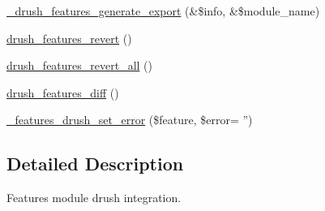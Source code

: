 \begin{DoxyCompactItemize}
\item 
\hyperlink{features_8drush_8inc_aa7000926946fab9e88e2f1798e6ec688}{\_\-drush\_\-features\_\-generate\_\-export} (\&\$info, \&\$module\_\-name)
\item 
\hyperlink{features_8drush_8inc_aaac9159c4d7d5f228fa134accf950ef0}{drush\_\-features\_\-revert} ()
\item 
\hyperlink{features_8drush_8inc_ad34f00c0b0713a83ac44557a361e7b35}{drush\_\-features\_\-revert\_\-all} ()
\item 
\hyperlink{features_8drush_8inc_a920aff13747c72e9657c0542707ebb87}{drush\_\-features\_\-diff} ()
\item 
\hyperlink{features_8drush_8inc_a4561151a5ec9bf2f20e09ad0f047d5bd}{\_\-features\_\-drush\_\-set\_\-error} (\$feature, \$error= '')
\end{DoxyCompactItemize}


\subsection{Detailed Description}
Features module drush integration. 

